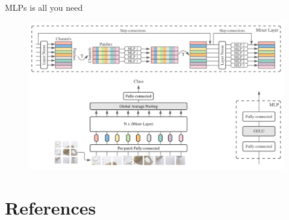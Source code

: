 \documentclass[xcolor=pdftex,dvipsnames,table,mathserif]{beamer}
\begin{document}
\begin{frame}{MLPs is all you need~\cite{tolstikhin_mlp-mixer_2021}}


  \begin{figure}[ht]
    \centering
    \includegraphics[width=\textwidth]{mixer}
    \caption{\label{fig:label} }
  \end{figure}

\end{frame}



\section*{References}


\end{document}
